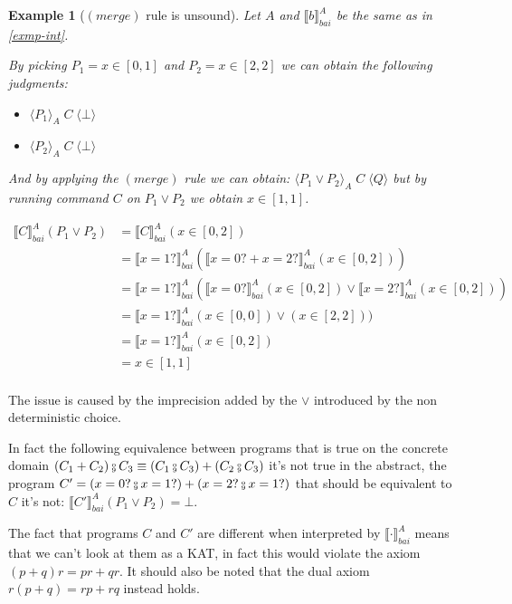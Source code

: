 \documentclass{article}
\newtheorem{exmp}{Example}[section]
\newcommand{\atriple}[4][A]{
    \langle #2 \rangle_#1 \; #3 \; \langle #4 \rangle
}
\newcommand*{\sem}[1]{
    \llbracket #1 \rrbracket
}
\newcommand{\bca}[2]{
    #2_{bai}^{#1}
}
\newcommand{\bsem}[2][A]{
    \bca{#1}{\sem{#2}}
}
\def\fcmp{\mathbin{\raise 0.6ex\hbox{\oalign{\hfil$\scriptscriptstyle      
    \mathrm{o}$\hfil\cr\hfil$\scriptscriptstyle\mathrm{9}$\hfil}}}}
\begin{document}
    \begin{exmp}[$(merge)$ rule is unsound]
        Let $A$ and $\bsem{b}$ be the same as in \ref{exmp-int}.

        By picking $P_1 = x \in [0, 1]$ and $P_2 = x \in [2, 2]$ we can 
        obtain the following judgments:
        \begin{itemize}
            \item $\atriple{P_1}C{\bot}$
            \item $\atriple{P_2}C{\bot}$
        \end{itemize}

        And by applying the $(merge)$ rule we can obtain:
        $\atriple{P_1 \lor P_2}{C}{Q}$ but by running command $C$ on 
        $P_1 \lor P_2$ we obtain $x \in [1, 1]$.

        \begin{align*}
            \bsem{C}(P_1 \lor P_2) 
                &= \bsem{C}(x \in [0, 2]) \\
                &= \bsem{x = 1?}(\bsem{x = 0? + x = 2?}(x \in [0, 2])) \\
                &= \bsem{x = 1?}(\bsem{x = 0?}(x \in [0, 2])\lor 
                    \bsem{x = 2?}(x \in [0, 2])) \\
                &= \bsem{x = 1?}(x \in [0, 0])\lor 
                    (x \in [2, 2])) \\
                &= \bsem{x = 1?}(x \in [0, 2]) \\
                &= x \in [1, 1] \\
        \end{align*}

    \end{exmp}

    The issue is caused by the imprecision added by the $\lor$ 
    introduced by the non deterministic choice.

    In fact the following equivalence between programs that is true
    on the concrete domain $(C_1 + C_2) \fcmp C_3 
    \equiv (C_1 \fcmp C_3) + (C_2 \fcmp C_3)$ it's not true in the 
    abstract, the program $C' = (x = 0? \fcmp x = 1?) + (x = 2? 
    \fcmp x = 1?)$ that should be equivalent to $C$ it's not:
    $\bsem{C'}(P_1 \lor P_2) = \bot$.

    The fact that programs $C$ and $C'$ are different when interpreted by
    $\bsem{\cdot}$ means that we can't look at them as a KAT, in fact
    this would violate the axiom $(p + q)r = pr + qr$. It should also
    be noted that the dual axiom $r(p + q) = rp + rq$ instead holds.
\end{document}
